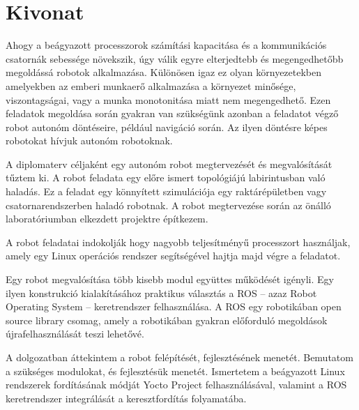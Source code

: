 \setcounter{page}{1}

\selecthungarian

\chapter*{Kivonat}

Ahogy a beágyazott processzorok számítási kapacitása és a kommunikációs csatornák
sebessége növekszik, úgy válik egyre elterjedtebb és megengedhetőbb megoldássá
robotok alkalmazása. Különösen igaz ez olyan környezetekben amelyekben az emberi
munkaerő alkalmazása a környezet minősége, viszontagságai, vagy a munka
monotonitása miatt nem megengedhető. Ezen feladatok megoldása során gyakran van
szükségünk azonban a feladatot végző robot autonóm döntéseire, például navigáció
során. Az ilyen döntésre képes robotokat hívjuk autonóm robotoknak.

A diplomaterv céljaként egy autonóm robot megtervezését és megvalósítását tűztem
ki. A robot feladata egy előre ismert topológiájú labirintusban való haladás. Ez
a feladat egy könnyített szimulációja egy raktárépületben vagy
csatornarendszerben haladó robotnak. A robot megtervezése során az önálló
laboratóriumban elkezdett projektre építkezem.

A robot feladatai indokolják hogy nagyobb teljesítményű processzort használjak,
amely egy Linux operációs rendszer segítségével hajtja majd végre a feladatot.

Egy robot megvalósítása több kisebb modul együttes működését igényli. Egy ilyen
konstrukció kialakításához praktikus választás a ROS -- azaz Robot Operating
System -- keretrendszer felhasználása. A ROS egy robotikában open source library
csomag, amely a robotikában gyakran előforduló megoldások újrafelhasználását
teszi lehetővé.

A dolgozatban áttekintem a robot felépítését, fejlesztésének menetét. Bemutatom a
szükséges modulokat, és fejlesztésük menetét. Ismertetem a beágyazott Linux
rendszerek fordításának módját Yocto Project felhasználásával, valamint a ROS
keretrendszer integrálását a keresztfordítás folyamatába.

\vfill
\selectenglish


